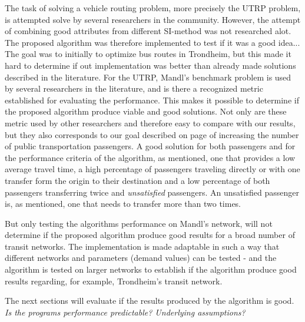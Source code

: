 
The task of solving a vehicle routing problem, more precisely the UTRP problem, is attempted solve by several researchers in the community. However, the attempt of combining good attributes from different SI-method was not researched alot. The proposed algorithm was therefore implemented to test if it was a good idea... The goal was to initially to optimize bus routes in Trondheim, but this made it hard to determine if out implementation was better than already made solutions described in the literature. For the UTRP, Mandl's benchmark problem is used by several researchers in the literature, and is there a recognized metric established for evaluating the performance. This makes it possible to determine if the proposed algorithm produce viable and good solutions. Not only are these metric used by other researchers and therefore easy to compare with our results, but they also corresponds to our goal described on page \pageref{itm:goal} of increasing the number of public transportation passengers. A good solution for both passengers and for the performance criteria of the algorithm, as mentioned, one that provides a low average travel time, a high percentage of passengers traveling directly or with one transfer form the origin to their destination and a low percentage of both passengers transferring twice and \textit{unsatisfied} passengers. An unsatisfied passenger is, as mentioned, one that needs to transfer more than two times. 

But only testing the algorithms performance on Mandl's network, will not determine if the proposed algorithm produce good results for a broad number of transit networks. The implementation is made adaptable in such a way that different networks and parameters (demand values) can be tested - and the algorithm is tested on larger networks to establish if the algorithm produce good results regarding, for example, Trondheim's transit network.

The next sections will evaluate if the results produced by the algorithm is good. \emph{\color{blue}Is the programs performance predictable? Underlying assumptions?}